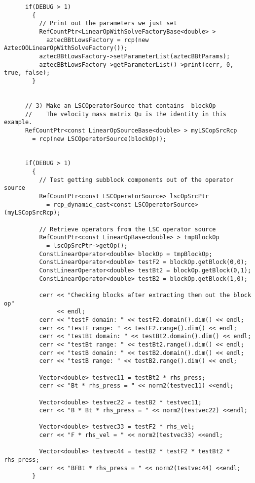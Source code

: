 \begin{verbatim}
      if(DEBUG > 1)
        {
          // Print out the parameters we just set
          RefCountPtr<LinearOpWithSolveFactoryBase<double> > 
            aztecBBtLowsFactory = rcp(new AztecOOLinearOpWithSolveFactory());
          aztecBBtLowsFactory->setParameterList(aztecBBtParams);
          aztecBBtLowsFactory->getParameterList()->print(cerr, 0, true, false);
        }


      // 3) Make an LSCOperatorSource that contains  blockOp
      //    The velocity mass matrix Qu is the identity in this example.
      RefCountPtr<const LinearOpSourceBase<double> > myLSCopSrcRcp 
        = rcp(new LSCOperatorSource(blockOp));


      if(DEBUG > 1) 
        {
          // Test getting subblock components out of the operator source
          RefCountPtr<const LSCOperatorSource> lscOpSrcPtr 
            = rcp_dynamic_cast<const LSCOperatorSource>(myLSCopSrcRcp);  
	  
          // Retrieve operators from the LSC operator source
          RefCountPtr<const LinearOpBase<double> > tmpBlockOp 
            = lscOpSrcPtr->getOp();
          ConstLinearOperator<double> blockOp = tmpBlockOp;
          ConstLinearOperator<double> testF2 = blockOp.getBlock(0,0);
          ConstLinearOperator<double> testBt2 = blockOp.getBlock(0,1);
          ConstLinearOperator<double> testB2 = blockOp.getBlock(1,0);	 
	  
          cerr << "Checking blocks after extracting them out the block op"
               << endl;
          cerr << "testF domain: " << testF2.domain().dim() << endl;
          cerr << "testF range: " << testF2.range().dim() << endl;
          cerr << "testBt domain: " << testBt2.domain().dim() << endl;
          cerr << "testBt range: " << testBt2.range().dim() << endl;
          cerr << "testB domain: " << testB2.domain().dim() << endl;
          cerr << "testB range: " << testB2.range().dim() << endl;

          Vector<double> testvec11 = testBt2 * rhs_press;
          cerr << "Bt * rhs_press = " << norm2(testvec11) <<endl;
	  
          Vector<double> testvec22 = testB2 * testvec11;
          cerr << "B * Bt * rhs_press = " << norm2(testvec22) <<endl;
	  
          Vector<double> testvec33 = testF2 * rhs_vel;
          cerr << "F * rhs_vel = " << norm2(testvec33) <<endl;
	  
          Vector<double> testvec44 = testB2 * testF2 * testBt2 * rhs_press;
          cerr << "BFBt * rhs_press = " << norm2(testvec44) <<endl;
        }



\end{verbatim}
